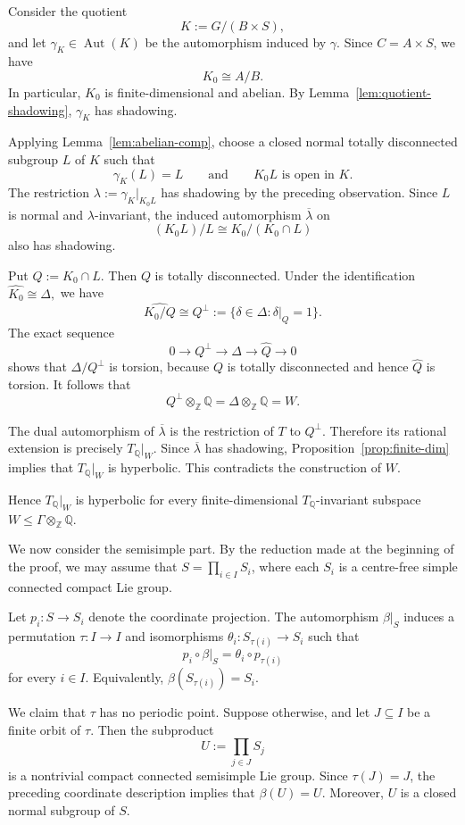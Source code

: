 \documentclass[12pt]{amsart}
\theoremstyle{definition}
\numberwithin{equation}{section}
\theoremstyle{remark}
\def\Aut{\operatorname{Aut}}
\begin{document}
Consider the quotient
\[
K:=G/(B\times S),
\]
and let $\gamma_K\in\Aut(K)$ be the automorphism induced by $\gamma$. Since
$C=A\times S$, we have
\[
K_0\cong A/B.
\]
In particular, $K_0$ is finite-dimensional and abelian. By
Lemma~\ref{lem:quotient-shadowing}, $\gamma_K$ has shadowing.

Applying Lemma~\ref{lem:abelian-comp}, choose a closed normal totally
disconnected subgroup $L$ of $K$ such that
\[
\gamma_K(L)=L
\qquad\text{and}\qquad
K_0L\text{ is open in }K.
\]
The restriction
$
\lambda:=\gamma_K|_{K_0L}
$
has shadowing by the preceding observation. Since $L$ is normal and
$\lambda$-invariant, the induced automorphism
$
\overline\lambda
$
on
\[
(K_0L)/L
\cong
K_0/(K_0\cap L)
\]
also has shadowing.

Put
$
Q:=K_0\cap L.
$
Then $Q$ is totally disconnected. Under the identification
$
\widehat{K_0}\cong\Delta,
$
we have
\[
\widehat{K_0/Q}
\cong
Q^\perp
:=
\{\delta\in\Delta:\delta|_Q=1\}.
\]
The exact sequence
\[
0\longrightarrow Q^\perp
\longrightarrow \Delta
\longrightarrow \widehat Q
\longrightarrow 0
\]
shows that $\Delta/Q^\perp$ is torsion, because $Q$ is totally
disconnected and hence $\widehat Q$ is torsion. It follows that
\[
Q^\perp\otimes_{\mathbb Z}\mathbb Q
=
\Delta\otimes_{\mathbb Z}\mathbb Q
=
W.
\]

The dual automorphism of $\overline\lambda$ is the restriction of
$T$ to $Q^\perp$. Therefore its rational extension is precisely
$
T_{\mathbb Q}|_W.
$
Since $\overline\lambda$ has shadowing,
Proposition~\ref{prop:finite-dim} implies that
$T_{\mathbb Q}|_W$ is hyperbolic. This contradicts the construction
of $W$.

Hence $T_{\mathbb Q}|_W$ is hyperbolic for every finite-dimensional
$T_{\mathbb Q}$-invariant subspace
$W\leq\Gamma\otimes_{\mathbb Z}\mathbb Q$.

We now consider the semisimple part. By the reduction made at the
beginning of the proof, we may assume that
$S=\prod_{i\in I}S_i$, where each $S_i$ is a centre-free simple connected compact Lie group.

Let $p_i:S\to S_i$ denote the coordinate projection. The
automorphism $\beta|_S$ induces a permutation $\tau:I\to I$ and
isomorphisms $\theta_i:S_{\tau(i)}\to S_i$ such that
\[
p_i\circ\beta|_S=\theta_i\circ p_{\tau(i)}
\]
for every $i\in I$. Equivalently,
$\beta(S_{\tau(i)})=S_i$.

We claim that $\tau$ has no periodic point. Suppose otherwise, and let
$J\subseteq I$ be a finite orbit of $\tau$. Then the subproduct
\[
U:=\prod_{j\in J}S_j
\]
is a nontrivial compact connected semisimple Lie group. Since
$\tau(J)=J$, the preceding coordinate description implies that
$\beta(U)=U$. Moreover, $U$ is a closed normal subgroup of $S$.
\end{document}
